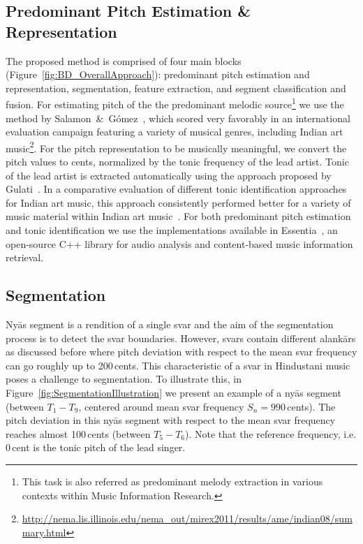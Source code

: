 \subsection{Predominant Pitch Estimation \& Representation}

The proposed method is comprised of four main blocks (Figure~\ref{fig:BD_OverallApproach}): predominant pitch estimation and representation, segmentation, feature extraction, and segment classification and fusion. For estimating pitch of the the predominant melodic source\footnote{This task is also referred as predominant melody extraction in various contexts within Music Information Research.} we use the method by Salamon~\&~G\'omez~\cite{Salamon2012}, which scored very favorably in an international evaluation campaign featuring a variety of musical genres, including Indian art music\footnote{\url{http://nema.lis.illinois.edu/nema_out/mirex2011/results/ame/indian08/summary.html}}. For the pitch representation to be musically meaningful, we convert the pitch values to cents, normalized by the tonic frequency of the lead artist. Tonic of the lead artist is extracted automatically using the approach proposed by Gulati~\cite{SGulati_MThesis2012}. In a comparative evaluation of different tonic identification approaches for Indian art music, this approach consistently performed better for a variety of music material within Indian art music~\cite{Gulati2013Tonic}. For both predominant pitch estimation and tonic identification we use the implementations available in Essentia~\cite{essentia}, an open-source C++ library for audio analysis and content-based music information retrieval.


\subsection{Segmentation}
\label{sec:segmentation}

Ny\={a}s segment is a rendition of a single svar and the aim of the segmentation process is to detect the svar boundaries. However, svars contain different alank\={a}rs as discussed before where pitch deviation with respect to the mean svar frequency can go roughly up to 200\,cents. This characteristic of a svar in Hindustani music poses a challenge to segmentation. To illustrate this, in Figure~\ref{fig:SegmentationIllustration} we present an example of a ny\={a}s segment (between $T_1-T_9$, centered around mean svar frequency $S_n=990$\,cents). The pitch deviation in this ny\={a}s segment with respect to the mean svar frequency reaches almost 100\,cents (between $T_5-T_6$). Note that the reference frequency, i.e. 0\,cent is the tonic pitch of the lead singer.


